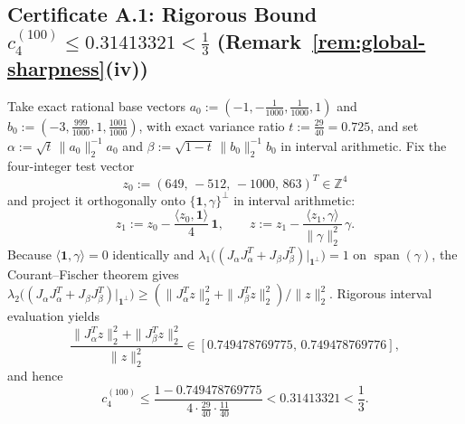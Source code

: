 \documentclass[11pt,a4paper]{article}
\theoremstyle{definition}
\DeclareMathOperator{\Span}{span}
\newcommand{\one}{\mathbf{1}}
\begin{document}
\subsection*{Certificate A.1: Rigorous Bound $c_4^{(100)} \le 0.31413321 < \frac{1}{3}$ (Remark~\ref{rem:global-sharpness}(iv))}
Take exact rational base vectors $a_0 := (-1, -\frac{1}{1000}, \frac{1}{1000}, 1)$ and $b_0 := (-3, \frac{999}{1000}, 1, \frac{1001}{1000})$, with exact variance ratio $t := \frac{29}{40} = 0.725$, and set $\alpha := \sqrt{t}\,\|a_0\|_2^{-1} a_0$ and $\beta := \sqrt{1-t}\,\|b_0\|_2^{-1} b_0$ in interval arithmetic. Fix the four-integer test vector
\[
z_0 := (649,\, -512,\, -1000,\, 863)^T \in \mathbb{Z}^4
\]
and project it orthogonally onto $\{\one, \gamma\}^\perp$ in interval arithmetic:
\[
z_1 := z_0 - \frac{\langle z_0, \one\rangle}{4}\,\one, \qquad
z := z_1 - \frac{\langle z_1, \gamma\rangle}{\|\gamma\|_2^2}\,\gamma.
\]
Because $\langle \one, \gamma\rangle = 0$ identically and $\lambda_1\bigl((J_\alpha J_\alpha^T + J_\beta J_\beta^T)|_{\one^\perp}\bigr) = 1$ on $\Span(\gamma)$, the Courant--Fischer theorem gives $\lambda_2\bigl((J_\alpha J_\alpha^T + J_\beta J_\beta^T)|_{\one^\perp}\bigr) \ge (\|J_\alpha^T z\|_2^2 + \|J_\beta^T z\|_2^2)/\|z\|_2^2$. Rigorous interval evaluation yields
\[
\frac{\|J_\alpha^T z\|_2^2 + \|J_\beta^T z\|_2^2}{\|z\|_2^2} \in [0.749478769775,\, 0.749478769776],
\]
and hence
\[
c_4^{(100)} \le \frac{1 - 0.749478769775}{4 \cdot \frac{29}{40} \cdot \frac{11}{40}} < 0.31413321 < \frac{1}{3}.
\]
\end{document}

